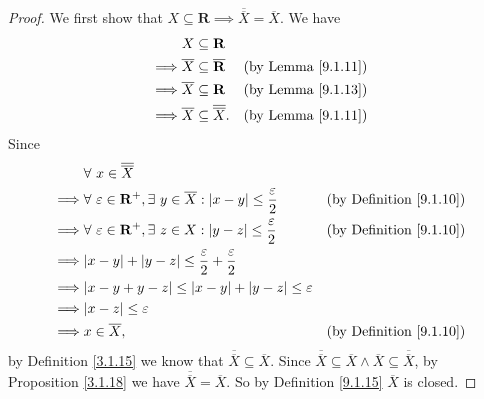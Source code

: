 \begin{proof}
    We first show that \(X \subseteq \mathbf{R} \implies \overline{\overline{X}} = \overline{X}\).
    We have
    \begin{align*}
                 & X \subseteq \mathbf{R}                                                           \\
        \implies & \overline{X} \subseteq \overline{\mathbf{R}}    & \text{(by Lemma \ref{9.1.11})} \\
        \implies & \overline{X} \subseteq \mathbf{R}               & \text{(by Lemma \ref{9.1.13})} \\
        \implies & \overline{X} \subseteq \overline{\overline{X}}. & \text{(by Lemma \ref{9.1.11})}
    \end{align*}
    Since
    \begin{align*}
                 & \forall\ x \in \overline{\overline{X}}                                                                                                             \\
        \implies & \forall\ \varepsilon \in \mathbf{R}^+, \exists\ y \in \overline{X} : \abs*{x - y} \leq \frac{\varepsilon}{2} & \text{(by Definition \ref{9.1.10})} \\
        \implies & \forall\ \varepsilon \in \mathbf{R}^+, \exists\ z \in X : \abs*{y - z} \leq \frac{\varepsilon}{2}            & \text{(by Definition \ref{9.1.10})} \\
        \implies & \abs*{x - y} + \abs*{y - z} \leq \frac{\varepsilon}{2} + \frac{\varepsilon}{2}                                                                     \\
        \implies & \abs*{x - y + y - z} \leq \abs*{x - y} + \abs*{y - z} \leq \varepsilon                                                                             \\
        \implies & \abs*{x - z} \leq \varepsilon                                                                                                                      \\
        \implies & x \in \overline{X},                                                                                          & \text{(by Definition \ref{9.1.10})}
    \end{align*}
    by Definition \ref{3.1.15} we know that \(\overline{\overline{X}} \subseteq \overline{X}\).
    Since \(\overline{\overline{X}} \subseteq \overline{X} \land \overline{X} \subseteq \overline{\overline{X}}\), by Proposition \ref{3.1.18} we have \(\overline{\overline{X}} = \overline{X}\).
    So by Definition \ref{9.1.15} \(\overline{X}\) is closed.


\end{proof}
